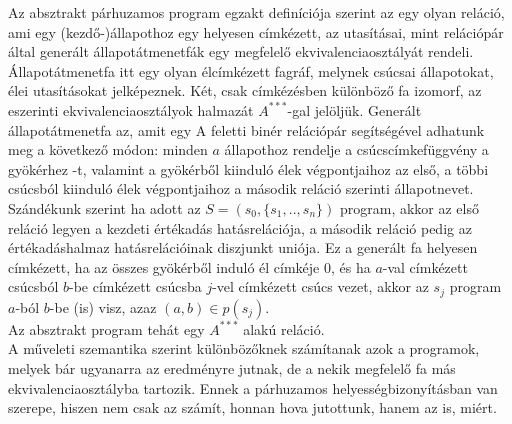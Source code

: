 \documentclass{article}
\begin{document}
Az absztrakt párhuzamos program egzakt definíciója szerint az egy olyan reláció, ami egy (kezdő-)állapothoz egy helyesen címkézett, az utasításai, mint relációpár által generált állapotátmenetfák egy megfelelő ekvivalenciaosztályát rendeli. Állapotátmenetfa itt egy olyan élcímkézett fagráf, melynek csúcsai állapotokat, élei utasításokat jelképeznek. Két, csak címkézésben különböző fa izomorf, az eszerinti ekvivalenciaosztályok halmazát $A^{***}$-gal jelöljük. Generált állapotátmenetfa az, amit egy A feletti binér relációpár segítségével adhatunk meg a következő módon: minden $a$ állapothoz rendelje a csúcscímkefüggvény a gyökérhez -t, valamint a gyökérből kiinduló élek végpontjaihoz az első, a többi csúcsból kiinduló élek végpontjaihoz a második reláció szerinti állapotnevet. Szándékunk szerint ha adott az $S = (s_0, \lbrace s_1,..,s_n \rbrace)$ program, akkor az első reláció legyen a kezdeti értékadás hatásrelációja, a második reláció pedig az értékadáshalmaz hatásrelációinak diszjunkt uniója. Ez a generált fa helyesen címkézett, ha az összes gyökérből induló él címkéje $0$, és ha $a$-val címkézett csúcsból $b$-be címkézett csúcsba $j$-vel címkézett csúcs vezet, akkor az $s_j$ program $a$-ból $b$-be (is) visz, azaz $(a,b) \in p(s_j)$.
\\
Az absztrakt program tehát egy $A^{***}$ alakú reláció.
\\
A műveleti szemantika szerint különbözőknek számítanak azok a programok, melyek bár ugyanarra az eredményre jutnak,
de a nekik megfelelő fa más ekvivalenciaosztályba tartozik. Ennek a párhuzamos helyességbizonyításban van szerepe,
hiszen nem csak az számít, honnan hova jutottunk, hanem az is, miért.
\end{document}
